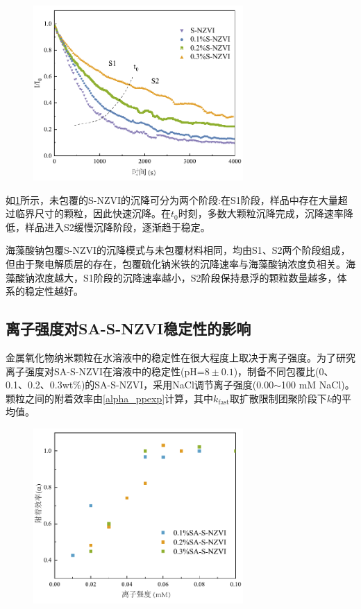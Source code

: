 \begin{figure}[h]
    \centering
    \includegraphics[width=8cm]{figs/fig1.pdf}
    \label{fig01}
\end{figure}

如\cref{fig01}所示，未包覆的S-NZVI的沉降可分为两个阶段:在S1阶段，样品中存在大量超过临界尺寸的颗粒，因此快速沉降。在$t_0$时刻，多数大颗粒沉降完成，沉降速率降低，样品进入S2缓慢沉降阶段，逐渐趋于稳定。

海藻酸钠包覆S-NZVI的沉降模式与未包覆材料相同，均由S1、S2两个阶段组成，但由于聚电解质层的存在，包覆硫化钠米铁的沉降速率与海藻酸钠浓度负相关。海藻酸钠浓度越大，S1阶段的沉降速率越小，S2阶段保持悬浮的颗粒数量越多，体系的稳定性越好。

\subsection{离子强度对SA-S-NZVI稳定性的影响}

金属氧化物纳米颗粒在水溶液中的稳定性在很大程度上取决于离子强度。为了研究离子强度对SA-S-NZVI在溶液中的稳定性(pH=$8\pm 0.1$)，制备不同包覆比(0、0.1、0.2、0.3wt\%)的SA-S-NZVI，采用NaCl调节离子强度(0.00$\sim$100 mM NaCl)。颗粒之间的附着效率由\cref{alpha_ppexp}计算，其中$k_{\mathrm{fast}}$取扩散限制团聚阶段下$k$的平均值。

\begin{figure}[h]
    \centering
    \includegraphics[width=8cm]{figs/Graph1.pdf}
    \label{fig4}
\end{figure}

